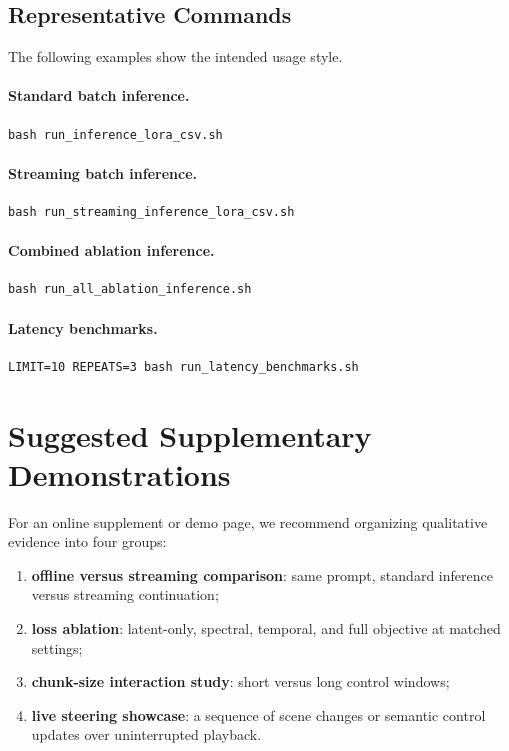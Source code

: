 \documentclass[11pt]{article}
\begin{document}
\subsection{Representative Commands}

The following examples show the intended usage style.

\paragraph{Standard batch inference.}
\begin{lstlisting}
bash run_inference_lora_csv.sh
\end{lstlisting}

\paragraph{Streaming batch inference.}
\begin{lstlisting}
bash run_streaming_inference_lora_csv.sh
\end{lstlisting}

\paragraph{Combined ablation inference.}
\begin{lstlisting}
bash run_all_ablation_inference.sh
\end{lstlisting}

\paragraph{Latency benchmarks.}
\begin{lstlisting}
LIMIT=10 REPEATS=3 bash run_latency_benchmarks.sh
\end{lstlisting}

\section{Suggested Supplementary Demonstrations}

For an online supplement or demo page, we recommend organizing qualitative evidence into four groups:
\begin{enumerate}
    \item \textbf{offline versus streaming comparison}: same prompt, standard inference versus streaming continuation;
    \item \textbf{loss ablation}: latent-only, spectral, temporal, and full objective at matched settings;
    \item \textbf{chunk-size interaction study}: short versus long control windows;
    \item \textbf{live steering showcase}: a sequence of scene changes or semantic control updates over uninterrupted playback.
\end{enumerate}
\end{document}
